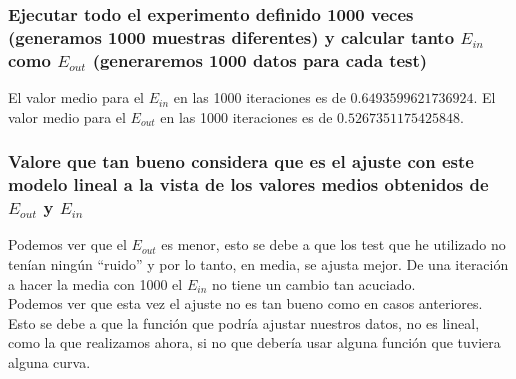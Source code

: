 \documentclass[12pt,a4paper]{article}
\begin{document}
\subsubsection{Ejecutar todo el experimento definido 1000 veces (generamos 1000	muestras diferentes) y calcular tanto $E_{in}$ como $E_{out}$ (generaremos 1000 datos para cada test)}
El valor medio para el $E_{in}$ en las 1000 iteraciones es de $0.6493599621736924$.
El valor medio para el $E_{out}$ en las 1000 iteraciones es de $0.5267351175425848$.

\subsubsection{Valore que tan bueno considera que es el ajuste con este modelo lineal a la vista	de los valores medios obtenidos de $E_{out}$ y $E_{in}$}
Podemos ver que el $E_{out}$ es menor, esto se debe a que los test que he utilizado no tenían ningún ``ruido'' y por lo tanto, en media, se ajusta mejor. De una iteración a hacer la media con 1000 el $E_{in}$ no tiene un cambio tan acuciado.\\ Podemos ver que esta vez el ajuste no es tan bueno como en casos anteriores. Esto se debe a que la función que podría ajustar nuestros datos, no es lineal, como la que realizamos ahora, si no que debería usar alguna función que tuviera alguna curva.
\end{document}

